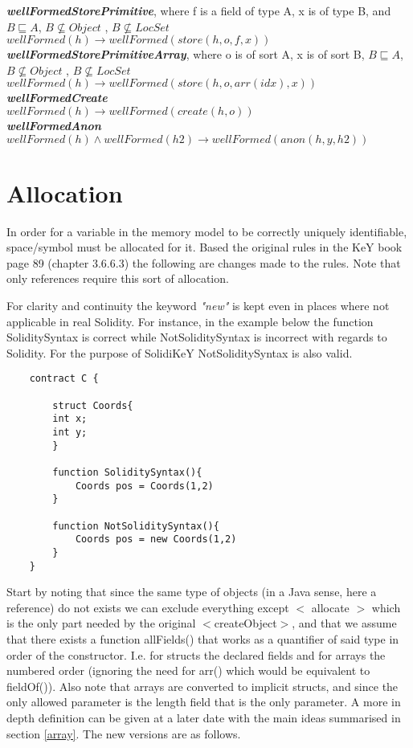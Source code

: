 \documentclass{article}
\begin{document}
	\textit{\textbf{wellFormedStorePrimitive}}, where f is a field of type A, x is of type B, and $B \sqsubseteq A$, $B 
	\nsubseteq Object$ , $B \nsubseteq LocSet$\\
	$wellFormed(h) \to wellFormed(store(h,o, f, x))$\\
	
	\textit{\textbf{wellFormedStorePrimitiveArray}},  where o is of sort A, x is of sort B, $B \sqsubseteq A$, $B \nsubseteq Object$ , $B \nsubseteq LocSet$ \\
	$wellFormed(h) \to wellFormed(store(h,o,arr(idx), x))$\\
	
	\textit{\textbf{wellFormedCreate}} \\
	$wellFormed(h) \to wellFormed(create(h,o))$\\
	
	\textit{\textbf{wellFormedAnon}} \\
	$wellFormed(h)\land wellFormed(h2) \to wellFormed(anon(h, y,h2))$\\
	
	\section{Allocation} \label{alloc}
	In order for a variable in the memory model to be correctly uniquely identifiable, space/symbol must be allocated for it. Based the original rules in the KeY book page 89 (chapter 3.6.6.3) the following are changes made to the rules. Note that only references require this sort of allocation. 
	
	For clarity and continuity the keyword \textit{"new"} is kept even in places where not applicable in real Solidity. For instance, in the example below the function SoliditySyntax is correct while NotSoliditySyntax is incorrect with regards to Solidity. For the purpose of SolidiKeY NotSoliditySyntax is also valid. 
	
	\begin{lstlisting}
	contract C {
		
		struct Coords{
		int x;
		int y;
		}
	
		function SoliditySyntax(){
			Coords pos = Coords(1,2)
		}
		
		function NotSoliditySyntax(){
			Coords pos = new Coords(1,2)
		}
	}
	\end{lstlisting}
	
	Start by noting that since the same type of objects (in a Java sense, here a reference) do not exists we can exclude everything except $<$ allocate $>$ which is the only part needed by the original $<$createObject$>$, and that we assume that there exists a function allFields() that works as a quantifier of said type in order of the constructor. I.e. for structs the declared fields and for arrays the numbered order (ignoring the need for arr() which would be equivalent to fieldOf()). Also note that arrays are converted to implicit structs, and since the only allowed parameter is the length field that is the only parameter. A more in depth definition can be given at a later date with the main ideas summarised in section \ref{array}. The new versions are as follows. 
	
\end{document}
